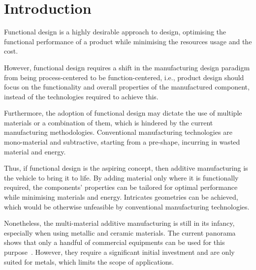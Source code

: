 
%
%

\chapter{Introduction}%
\label{cha:introduction}
Functional design is a highly desirable approach to design, optimising the
functional performance of a product while minimising the resources usage and the
cost.

However, functional design requires a shift in the manufacturing design
paradigm from being process-centered to be function-centered, i.e., product
design should focus on the functionality and overall properties of the
manufactured component, instead of the technologies required to achieve this.

Furthermore, the adoption of functional design may dictate the use of multiple
materials or a combination of them, which is hindered by the current
manufacturing methodologies. Conventional manufacturing technologies are mono-material and
subtractive, starting from a pre-shape, incurring in wasted material and energy. 

Thus, if functional design is the aspiring concept, then additive manufacturing
is the vehicle to bring it to life. By adding material only where it is
functionally required, the components' properties can be tailored for optimal
performance while minimising materials and energy. Intricates geometries can be
achieved, which would be otherwise unfeasible by conventional manufacturing
technologies.

Nonetheless, the multi-material additive manufacturing is still in its infancy,
especially when using metallic and ceramic materials. The current panorama shows that only a handful of commercial equipments can
be used for this purpose~\cite{aconityMIDI, slm280}. However, they require a significant initial
investment and are only suited for metals, which limits the scope of applications.

